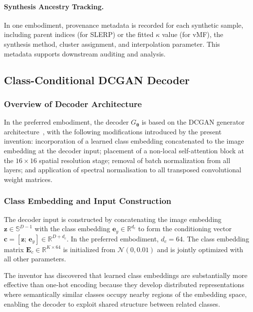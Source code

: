\documentclass[12pt,letterpaper]{article}
\newcommand{\bz}{\mathbf{z}}
\newcommand{\bc}{\mathbf{c}}
\newcommand{\btheta}{\bm{\theta}}
\newcommand{\RR}{\mathbb{R}}
\newcommand{\NN}{\mathcal{N}}
\newcommand{\Sphere}{\mathbb{S}}
\begin{document}
\paragraph{Synthesis Ancestry Tracking.}

In one embodiment, provenance metadata is recorded for each synthetic sample,
including parent indices (for SLERP) or the fitted $\kappa$ value (for vMF),
the synthesis method, cluster assignment, and interpolation parameter.  This
metadata supports downstream auditing and analysis.

\subsection{Class-Conditional DCGAN Decoder}

\subsubsection{Overview of Decoder Architecture}

In the preferred embodiment, the decoder $G_{\btheta}$ is based on the DCGAN
generator architecture~\cite{radford2016}, with the following modifications
introduced by the present invention: incorporation of a learned class
embedding concatenated to the image embedding at the decoder input; placement
of a non-local self-attention block at the $16 \times 16$ spatial resolution
stage; removal of batch normalization from all layers; and application of
spectral normalisation to all transposed convolutional weight matrices.

\subsubsection{Class Embedding and Input Construction}

The decoder input is constructed by concatenating the image embedding
$\bz \in \Sphere^{D-1}$ with the class embedding
$\bm{e}_y \in \RR^{d_c}$ to form the conditioning vector
$\bc = [\bz;\, \bm{e}_y] \in \RR^{D + d_c}$.  In the preferred embodiment,
$d_c = 64$.  The class embedding matrix
$\mathbf{E}_c \in \RR^{K \times 64}$ is initialized from
$\NN(0, 0.01)$ and is jointly optimized with all other parameters.

The inventor has discovered that learned class embeddings are substantially
more effective than one-hot encoding because they develop distributed
representations where semantically similar classes occupy nearby regions of
the embedding space, enabling the decoder to exploit shared structure between
related classes.
\end{document}
